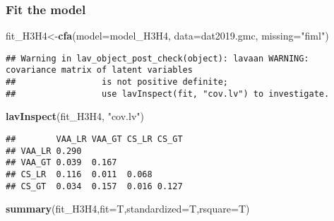 \documentclass[
]{article}
\newenvironment{Shaded}{\begin{snugshade}}{\end{snugshade}}
\newcommand{\DataTypeTok}[1]{\textcolor[rgb]{0.13,0.29,0.53}{#1}}
\newcommand{\KeywordTok}[1]{\textcolor[rgb]{0.13,0.29,0.53}{\textbf{#1}}}
\newcommand{\NormalTok}[1]{#1}
\newcommand{\StringTok}[1]{\textcolor[rgb]{0.31,0.60,0.02}{#1}}
\begin{document}
\hypertarget{fit-the-model-2}{%
\subsubsection{Fit the model}\label{fit-the-model-2}}

\begin{Shaded}
\begin{Highlighting}[]
\NormalTok{fit_H3H4<-}\KeywordTok{cfa}\NormalTok{(}\DataTypeTok{model=}\NormalTok{model_H3H4,}
              \DataTypeTok{data=}\NormalTok{dat2019.gmc,}
              \DataTypeTok{missing=}\StringTok{"fiml"}\NormalTok{)}
\end{Highlighting}
\end{Shaded}

\begin{verbatim}
## Warning in lav_object_post_check(object): lavaan WARNING: covariance matrix of latent variables
##                 is not positive definite;
##                 use lavInspect(fit, "cov.lv") to investigate.
\end{verbatim}

\begin{Shaded}
\begin{Highlighting}[]
\KeywordTok{lavInspect}\NormalTok{(fit_H3H4, }\StringTok{"cov.lv"}\NormalTok{)}
\end{Highlighting}
\end{Shaded}

\begin{verbatim}
##        VAA_LR VAA_GT CS_LR CS_GT
## VAA_LR 0.290                    
## VAA_GT 0.039  0.167             
## CS_LR  0.116  0.011  0.068      
## CS_GT  0.034  0.157  0.016 0.127
\end{verbatim}

\begin{Shaded}
\begin{Highlighting}[]
\KeywordTok{summary}\NormalTok{(fit_H3H4,}\DataTypeTok{fit=}\NormalTok{T,}\DataTypeTok{standardized=}\NormalTok{T,}\DataTypeTok{rsquare=}\NormalTok{T)}
\end{Highlighting}
\end{Shaded}
\end{document}
